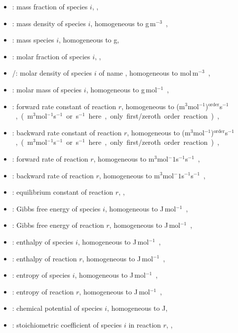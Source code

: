 \begin{itemize}
\item \massfrac[i]: mass fraction of species $i$, \nounit,
\item \mass[i]: mass density of species $i$, homogeneous to \unit{g\,m$^{-3}$},
\item \Mass[i]: mass species $i$, homogeneous to \unit{g},
\item \molarfrac[i]: molar fraction of species $i$, \nounit,
\item \molar[i]/\conc[I]: molar density of species $i$ of name , homogeneous to \unit{mol\,m$^{-3}$},
\item \Mm[i]: molar mass of species $i$, homogeneous to \unit{g\,mol$^{-1}$},
\item \fwdratecons[r]: forward rate constant of reaction $r$, homogeneous to \unit{(m$^3$mol$^{-1}$)$^{\text{order}}$s$^{-1}$},
                          (\unit{m$^3$mol$^{-1}$s$^{-1}$} or \unit{s$^{-1}$} here, only first/zeroth order reaction),
\item \bkwdratecons[r]: backward rate constant of reaction $r$, homogeneous to \unit{(m$^3$mol$^{-1}$)$^{\text{order}}$s$^{-1}$},
                          (\unit{m$^3$mol$^{-1}$s$^{-1}$} or \unit{s$^{-1}$} here, only first/zeroth order reaction),
\item \fwdrate[r]: forward rate of reaction $r$, homogeneous to \unit{m$^3$mol${^-1}$s$^{-1}$s$^{-1}$}, 
\item \bkwdrate[r]: backward rate of reaction $r$, homogeneous to \unit{m$^3$mol${^-1}$s$^{-1}$s$^{-1}$}, 
\item \Eqconst[r]: equilibrium constant of reaction $r$, \nounit,
\item \gibbs[i]: Gibbs free energy of species $i$, homogeneous to \unit{J\,mol$^{-1}$},
\item \Dgibbs[r]: Gibbs free energy of reaction $r$, homogeneous to \unit{J\,mol$^{-1}$},
\item \enth[i]: enthalpy of species $i$, homogeneous to \unit{J\,mol$^{-1}$},
\item \Denth[r]: enthalpy of reaction $r$, homogeneous to \unit{J\,mol$^{-1}$},
\item \entr[i]: entropy of species $i$, homogeneous to \unit{J\,mol$^{-1}$},
\item \Dentr[r]: entropy of reaction $r$, homogeneous to \unit{J\,mol$^{-1}$},
\item \chempot[i]: chemical potential of species $i$, homogeneous to \unit{J},
\item \scoef[i,r]: stoichiometric coefficient of species $i$ in reaction $r$, \nounit,

\end{itemize}
